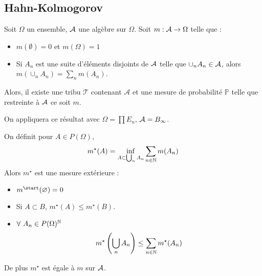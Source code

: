 \documentclass{cours}
\begin{document}
        \subsection{Hahn-Kolmogorov}
            \begin{theorem}
                Soit $\Omega$ un ensemble, $\mathcal{A}$ une algèbre sur $\Omega$.
                Soit $m : \mathcal{A} \rightarrow \Omega$ telle que : 
                \begin{itemize}
                    \item $m(\emptyset) = 0$ et $m(\Omega) = 1$
                    \item Si $A_{n}$ est une suite d'éléments disjoints de $\mathcal{A}$ telle que $\cup_{n} A_{n} \in \mathcal{A}$, alors $m\left(\cup_{n} A_{n}\right) = \sum_{n} m(A_{n})$.
                \end{itemize}
                Alors, il existe une tribu $\mathcal{T}$ contenant $\mathcal{A}$ et une mesure de probabilité $\mathbb{P}$ telle que restreinte à $\mathcal{A}$ ce soit $m$.
            \end{theorem}
            \begin{remark}
                On appliquera ce résultat avec $\Omega = \prod E_{n}$, $\mathcal{A} = B_{\infty}$.
            \end{remark}

            \begin{lemma}
                On définit pour $A \in P(\Omega)$, \[m^{\star}(A) = \inf_{A \subset \bigcup_{n} A_{n}} \sum_{n \in \mathbb{N}} m(A_{n})\]
                Alors $m^{\star}$ est une mesure extérieure :
                \begin{itemize}
                    \item $m^{\start}(\emptyset) = 0$
                    \item Si $A \subset B$, $m^{\star}(A) \leq m^{\star}(B)$.
                    \item $\forall \ A_{n} \in P(\Omega)^{\mathbb{N}}$ \[
                        m^{\star}\left(\bigcup_{n} A_{n}\right) \leq \sum_{n \in \mathbb{N}} m^{\star}(A_{n})
                    \]
                \end{itemize}
                De plus $m^{\star}$ est égale à $m$ sur $\mathcal{A}$.
            \end{lemma}
\end{document}
